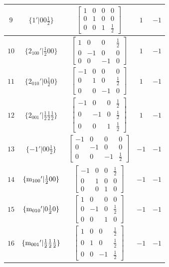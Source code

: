 \documentclass[fleqn,8pt]{jsarticle}
\begin{document}
\begin{longtable}{ccccc}
$ 9 $ & $ \{1{}'|0 0 \frac{1}{2}\} $ & $ \begin{bmatrix} 1 & 0 & 0 & 0 \\ 0 & 1 & 0 & 0 \\ 0 & 0 & 1 & \frac{1}{2} \end{bmatrix} $ & $ 1 $ & $ -1 $ \\ \hline
$ 10 $ & $ \{2{}_{100}{}'|\frac{1}{2} 0 0\} $ & $ \begin{bmatrix} 1 & 0 & 0 & \frac{1}{2} \\ 0 & -1 & 0 & 0 \\ 0 & 0 & -1 & 0 \end{bmatrix} $ & $ 1 $ & $ -1 $ \\ \hline
$ 11 $ & $ \{2{}_{010}{}'|0 \frac{1}{2} 0\} $ & $ \begin{bmatrix} -1 & 0 & 0 & 0 \\ 0 & 1 & 0 & \frac{1}{2} \\ 0 & 0 & -1 & 0 \end{bmatrix} $ & $ 1 $ & $ -1 $ \\ \hline
$ 12 $ & $ \{2{}_{001}{}'|\frac{1}{2} \frac{1}{2} \frac{1}{2}\} $ & $ \begin{bmatrix} -1 & 0 & 0 & \frac{1}{2} \\ 0 & -1 & 0 & \frac{1}{2} \\ 0 & 0 & 1 & \frac{1}{2} \end{bmatrix} $ & $ 1 $ & $ -1 $ \\ \hline
$ 13 $ & $ \{-1{}'|0 0 \frac{1}{2}\} $ & $ \begin{bmatrix} -1 & 0 & 0 & 0 \\ 0 & -1 & 0 & 0 \\ 0 & 0 & -1 & \frac{1}{2} \end{bmatrix} $ & $ -1 $ & $ -1 $ \\ \hline
$ 14 $ & $ \{{\rm m}_{100}{}'|\frac{1}{2} 0 0\} $ & $ \begin{bmatrix} -1 & 0 & 0 & \frac{1}{2} \\ 0 & 1 & 0 & 0 \\ 0 & 0 & 1 & 0 \end{bmatrix} $ & $ -1 $ & $ -1 $ \\ \hline
$ 15 $ & $ \{{\rm m}_{010}{}'|0 \frac{1}{2} 0\} $ & $ \begin{bmatrix} 1 & 0 & 0 & 0 \\ 0 & -1 & 0 & \frac{1}{2} \\ 0 & 0 & 1 & 0 \end{bmatrix} $ & $ -1 $ & $ -1 $ \\ \hline
$ 16 $ & $ \{{\rm m}_{001}{}'|\frac{1}{2} \frac{1}{2} \frac{1}{2}\} $ & $ \begin{bmatrix} 1 & 0 & 0 & \frac{1}{2} \\ 0 & 1 & 0 & \frac{1}{2} \\ 0 & 0 & -1 & \frac{1}{2} \end{bmatrix} $ & $ -1 $ & $ -1 $ \\
\end{longtable}
\end{document}
